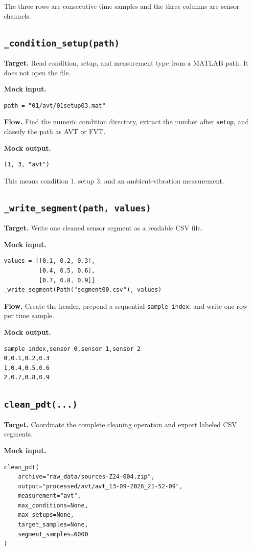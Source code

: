 \documentclass[11pt,a4paper]{article}
\begin{document}
The three rows are consecutive time samples and the three columns are sensor channels.

\subsection{\texttt{\_condition\_setup(path)}}
\textbf{Target.} Read condition, setup, and measurement type from a MATLAB path. It does not open the file.

\textbf{Mock input.}
\begin{lstlisting}
path = "01/avt/01setup03.mat"
\end{lstlisting}

\textbf{Flow.} Find the numeric condition directory, extract the number after \texttt{setup}, and classify the path as AVT or FVT.

\textbf{Mock output.}
\begin{lstlisting}
(1, 3, "avt")
\end{lstlisting}

This means condition 1, setup 3, and an ambient-vibration measurement.

\subsection{\texttt{\_write\_segment(path, values)}}
\textbf{Target.} Write one cleaned sensor segment as a readable CSV file.

\textbf{Mock input.}
\begin{lstlisting}
values = [[0.1, 0.2, 0.3],
          [0.4, 0.5, 0.6],
          [0.7, 0.8, 0.9]]
_write_segment(Path("segment00.csv"), values)
\end{lstlisting}

\textbf{Flow.} Create the header, prepend a sequential \texttt{sample\_index}, and write one row per time sample.

\textbf{Mock output.}
\begin{lstlisting}
sample_index,sensor_0,sensor_1,sensor_2
0,0.1,0.2,0.3
1,0.4,0.5,0.6
2,0.7,0.8,0.9
\end{lstlisting}

\subsection{\texttt{clean\_pdt(...)}}
\textbf{Target.} Coordinate the complete cleaning operation and export labeled CSV segments.

\textbf{Mock input.}
\begin{lstlisting}
clean_pdt(
    archive="raw_data/sources-Z24-004.zip",
    output="processed/avt/avt_13-09-2026_21-52-09",
    measurement="avt",
    max_conditions=None,
    max_setups=None,
    target_samples=None,
    segment_samples=6000
)
\end{lstlisting}
\end{document}
